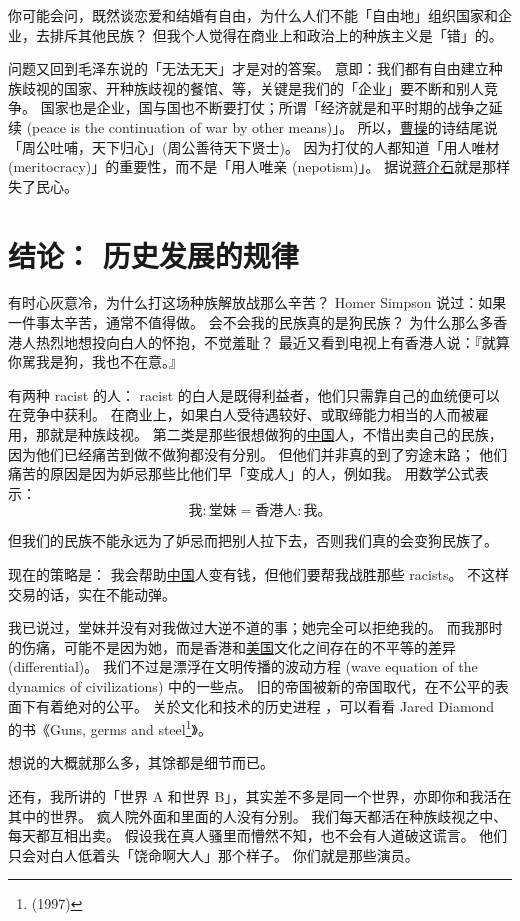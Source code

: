 \documentclass[12pt]{report}
\begin{document}
你可能会问，既然谈恋爱和结婚有自由，为什么人们不能「自由地」组织国家和企业，去排斥其他民族？ 但我个人觉得在商业上和政治上的种族主义是「错」的。

问题又回到毛泽东说的「无法无天」才是对的答案。 意即：我们都有自由建立种族歧视的国家、开种族歧视的餐馆、等，关键是我们的「企业」要不断和别人竞争。 国家也是企业，国与国也不断要打仗；所谓「经济就是和平时期的战争之延续 (peace is the continuation of war by other means)」。 所以，\uline{曹操}的诗结尾说「周公吐哺，天下归心」(周公善待天下贤士)。 因为打仗的人都知道「用人唯材 (meritocracy)」的重要性，而不是「用人唯亲 (nepotism)」。 据说\uline{蒋介石}就是那样失了民心。

\chapter{结论： 历史发展的规律}

有时心灰意冷，为什么打这场种族解放战那么辛苦？ Homer Simpson 说过：如果一件事太辛苦，通常不值得做。 会不会我的民族真的是狗民族？ 为什么那么多香港人热烈地想投向白人的怀抱，不觉羞耻？ 最近又看到电视上有香港人说：『就算你駡我是狗，我也不在意。』

有两种 racist 的人： racist 的白人是既得利益者，他们只需靠自己的血统便可以在竞争中获利。 在商业上，如果白人受待遇较好、或取缔能力相当的人而被雇用，那就是种族歧视。 第二类是那些很想做狗的\uline{中国}人，不惜出卖自己的民族，因为他们已经痛苦到做不做狗都没有分别。 但他们并非真的到了穷途末路； 他们痛苦的原因是因为妒忌那些比他们早「变成人」的人，例如我。 用数学公式表示：
$$ \mbox{我} : \mbox{堂妹} = \mbox{香港人} : \mbox{我。} $$

但我们的民族不能永远为了妒忌而把别人拉下去，否则我们真的会变狗民族了。

现在的策略是： 我会帮助\uline{中国}人变有钱，但他们要帮我战胜那些 racists。 不这样交易的话，实在不能动弹。

我已说过，堂妹并没有对我做过大逆不道的事；她完全可以拒绝我的。 而我那时的伤痛，可能不是因为她，而是香港和\uline{美国}文化之间存在的不平等的差异 (differential)。 我们不过是漂浮在文明传播的波动方程 (wave equation of the dynamics of civilizations) 中的一些点。 旧的帝国被新的帝国取代，在不公平的表面下有着绝对的公平。 关於文化和技术的历史进程 ，可以看看 Jared Diamond 的书《Guns, germs and steel\footnote{(1997)}》。

想说的大概就那么多，其馀都是细节而已。

还有，我所讲的「世界 A 和世界 B」，其实差不多是同一个世界，亦即你和我活在其中的世界。 疯人院外面和里面的人没有分别。 我们每天都活在种族歧视之中、每天都互相出卖。 假设我在真人骚里而懵然不知，也不会有人道破这谎言。 他们只会对白人低着头「饶命啊大人」那个样子。 你们就是那些演员。
\end{document}
